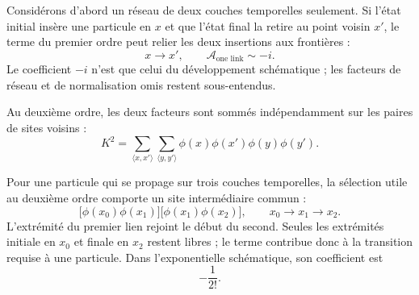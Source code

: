 Considérons d’abord un réseau de deux couches temporelles seulement. Si l’état initial insère une particule en \(x\) et que l’état final la retire au point voisin \(x'\), le terme du premier ordre peut relier les deux insertions aux frontières :
\begin{equation}
x\longrightarrow x',
\qquad
\mathcal{A}_{\text{one link}}\sim -i.
\end{equation}
Le coefficient \(-i\) n’est que celui du développement schématique ; les facteurs de réseau et de normalisation omis restent sous-entendus.

\begin{classroomqa}
\end{classroomqa}

Au deuxième ordre, les deux facteurs sont sommés indépendamment sur les paires de sites voisins :
\begin{equation}
K^2
=
\sum_{\langle x,x'\rangle}
\sum_{\langle y,y'\rangle}
\phi(x)\phi(x')\phi(y)\phi(y').
\end{equation}

\begin{classroomqa}
\end{classroomqa}

Pour une particule qui se propage sur trois couches temporelles, la sélection utile au deuxième ordre comporte un site intermédiaire commun :
\begin{equation}
\bigl[\phi(x_0)\phi(x_1)\bigr]
\bigl[\phi(x_1)\phi(x_2)\bigr],
\qquad
x_0\longrightarrow x_1\longrightarrow x_2.
\end{equation}
L’extrémité du premier lien rejoint le début du second. Seules les extrémités initiale en \(x_0\) et finale en \(x_2\) restent libres ; le terme contribue donc à la transition requise à une particule. Dans l’exponentielle schématique, son coefficient est
\begin{equation}
-\frac{1}{2!}.
\end{equation}

